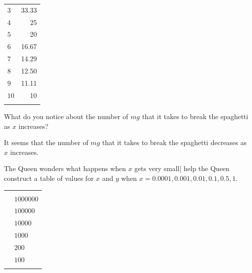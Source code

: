 \begin{problem}
\begin{subproblem}
\begin{shortsolution}
\begin{tabular}[t]{ld{2}}
				 $3$           & 33.33         \\\normalline
				 $4$           & 25            \\\normalline
				 $5$           & 20            \\\normalline
				 $6$           & 16.67         \\\normalline
				 $7$           & 14.29         \\\normalline
				 $8$           & 12.50         \\\normalline
				 $9$           & 11.11         \\\normalline
				 $10$          & 10            \\\lastline
			 \end{tabular}
		 \end{shortsolution}
	 \end{subproblem}
	 \begin{subproblem}
		 What do you notice about the number of $\unit{mg}$ that it takes to break
		 the spaghetti as $x$ increases?
		 \begin{shortsolution}
			 It seems that the number of $\unit{mg}$ that it takes to break the spaghetti decreases
			 as $x$ increases.
		 \end{shortsolution}
	 \end{subproblem}
	 \begin{subproblem}\label{rat:prob:spaglt1}
		 The Queen wonders what happens when $x$ gets very small| help the Queen construct
		 a table of values for $x$ and $y$ when $x=0.0001, 0.001, 0.01, 0.1, 0.5, 1$.
		 \begin{shortsolution}
			 \begin{tabular}[t]{d{2}l}
				 \beforeheading
				  & \heading{$y$} \\
				         & $1000000$     \\         & $100000$      \\          & $10000$       \\           & $1000$        \\           & $200$         \\             & $100$         \\\lastline
			 \end{tabular}
		 \end{shortsolution}
	 \end{subproblem}
	 \begin{subproblem}

\end{subproblem}
\end{problem}
